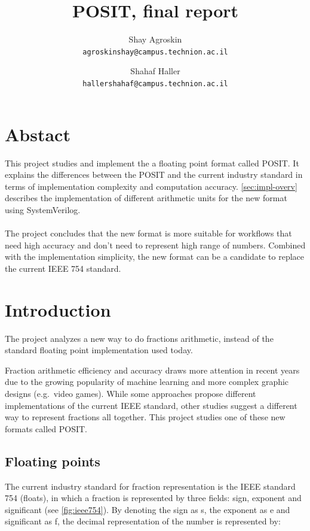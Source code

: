 \documentclass[10pt]{article}
\title{POSIT, final report}
\author{
  Shay Agroskin \\
  \texttt{agroskinshay@campus.technion.ac.il}
  \and
  Shahaf Haller \\
  \texttt{hallershahaf@campus.technion.ac.il}
}
\begin{document}
\maketitle

\tableofcontents

\pagebreak

\section{Abstact}\label{sec:abstact}

This project studies and implement the a floating point format called POSIT. It
explains the differences between the POSIT and the current industry standard in
terms of implementation complexity and computation accuracy.
\autoref{sec:impl-overv} describes the implementation of different arithmetic
units for the new format using SystemVerilog.

\paragraph{}
The project concludes that the new format is more suitable for
workflows that need high accuracy and don't need to represent high range of
numbers. Combined with the implementation simplicity, the new format can be a
candidate to replace the current IEEE 754 standard.

\section{Introduction}\label{sec:introduction}

The project analyzes a new way to do fractions arithmetic, instead of
the standard floating point implementation used today.

Fraction arithmetic efficiency and accuracy draws more attention in recent years
due to the growing popularity of machine learning and more complex graphic
designs (e.g.\ video games). While some approaches propose different
implementations of the current IEEE standard, other studies suggest a different
way to represent fractions all together.
This project studies one of these new formats called POSIT\cite{gustavson}.\@

\subsection{Floating points}\label{sec:floatingpoints}

The current industry standard for fraction representation is the IEEE standard
754 (floats), in which a fraction is represented by three fields: sign, exponent
and significant (see \autoref{fig:ieee754}). By denoting the sign as s, the exponent as e and significant
as f, the decimal representation of the number is represented by:
\end{document}
